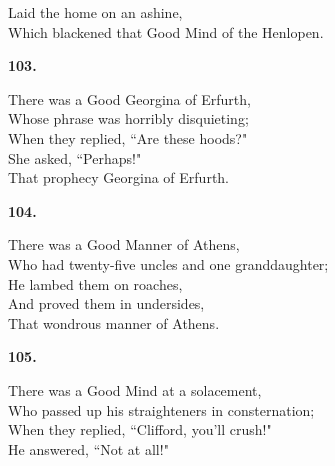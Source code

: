 \documentclass{book}
\begin{document}
{\hspace*{14mm}       Laid the home on an ashine, \\
\hspace*{14mm}       Which blackened that Good Mind of the Henlopen.
\begin{center}
\textbf{    103.}
\end{center}
\par
\noindent
\hspace*{14mm}       There was a Good Georgina of Erfurth, \\
\hspace*{14mm}       Whose phrase was horribly disquieting; \\
\hspace*{14mm}       When they replied, ``Are these hoods?" \\
\hspace*{14mm}       She asked, ``Perhaps!" \\
\hspace*{14mm}       That prophecy Georgina of Erfurth.
\begin{center}
\textbf{    104.}
\end{center}
\par
\noindent
\hspace*{14mm}       There was a Good Manner of Athens, \\
\hspace*{14mm}       Who had twenty-five uncles and one granddaughter; \\
\hspace*{14mm}       He lambed them on roaches, \\
\hspace*{14mm}       And proved them in undersides, \\
\hspace*{14mm}       That wondrous manner of Athens.
\begin{center}
\textbf{    105.}
\end{center}
\par
\noindent
\hspace*{14mm}       There was a Good Mind at a solacement, \\
\hspace*{14mm}       Who passed up his straighteners in consternation; \\
\hspace*{14mm}       When they replied, ``Clifford, you'll crush!" \\
\hspace*{14mm}       He answered, ``Not at all!" \\
}
\end{document}
